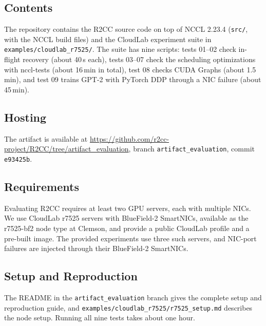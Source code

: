 \documentclass[letterpaper,twocolumn,10pt]{article}
\begin{document}
\subsection*{Contents}

The repository contains the R2CC source code on top of NCCL 2.23.4 (\texttt{src/}, with the NCCL build files) and the CloudLab experiment suite in \texttt{examples/cloudlab\_r7525/}. The suite has nine scripts: tests 01--02 check in-flight recovery (about 40\,s each), tests 03--07 check the scheduling optimizations with nccl-tests (about 16\,min in total), test 08 checks CUDA Graphs (about 1.5\,min), and test 09 trains GPT-2 with PyTorch DDP through a NIC failure (about 45\,min).

\subsection*{Hosting}

The artifact is available at \url{https://github.com/r2cc-project/R2CC/tree/artifact_evaluation}, branch \texttt{artifact\_evaluation}, commit \texttt{e93425b}.

\subsection*{Requirements}
Evaluating R2CC requires at least two GPU servers, each with multiple NICs. We use CloudLab r7525 servers with BlueField-2 SmartNICs, available as the r7525-bf2 node type at Clemson, and provide a public CloudLab profile and a pre-built image. The provided experiments use three such servers, and NIC-port failures are injected through their BlueField-2 SmartNICs.

\subsection*{Setup and Reproduction}

The README in the \texttt{artifact\_evaluation} branch gives the complete setup and reproduction guide, and \texttt{examples/cloudlab\_r7525/r7525\_setup.md} describes the node setup. Running all nine tests takes about one hour.

\end{document}
